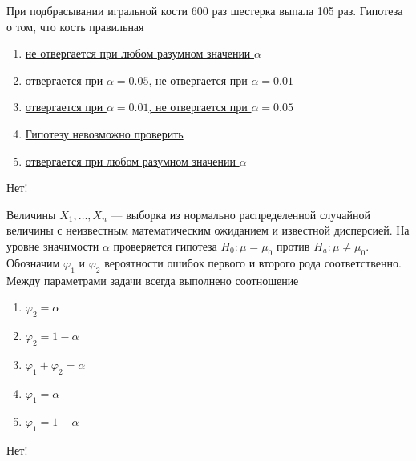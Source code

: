 \documentclass[t]{beamer}
\begin{document}
 \begin{frame} \label{13-No} 
\begin{block}{13} 

  При подбрасывании игральной кости 600 раз шестерка выпала 105 раз. Гипотеза о том, что кость правильная
  


 \end{block} 
\begin{enumerate} 
\item[] \hyperlink{13-Yes}{\beamergotobutton{} не отвергается при любом разумном значении $\alpha$}
\item[] \hyperlink{13-No}{\beamergotobutton{} отвергается при $\alpha = 0.05$, не отвергается при $\alpha = 0.01$}
\item[] \hyperlink{13-No}{\beamergotobutton{} отвергается при $\alpha = 0.01$, не отвергается при $\alpha = 0.05$}
\item[] \hyperlink{13-No}{\beamergotobutton{} Гипотезу невозможно проверить}
\item[] \hyperlink{13-No}{\beamergotobutton{} отвергается при любом разумном значении $\alpha$}
\end{enumerate} 

 \alert{Нет!} 
\end{frame} 


 \begin{frame} \label{14-No} 
\begin{block}{14} 

  Величины $X_1,\ldots,X_n$ — выборка из нормально распределенной случайной величины с неизвестным математическим ожиданием и известной дисперсией. На уровне значимости $\alpha$ проверяется гипотеза $H_0: \mu = \mu_0$ против $H_a: \mu \neq \mu_0$. Обозначим $\varphi_1$ и $\varphi_2$ вероятности ошибок первого и второго рода соответственно. Между параметрами задачи всегда выполнено соотношение
  


 \end{block} 
\begin{enumerate} 
\item[] \hyperlink{14-No}{\beamergotobutton{} $\varphi_2 = \alpha$}
\item[] \hyperlink{14-No}{\beamergotobutton{} $\varphi_2 = 1 - \alpha$}
\item[] \hyperlink{14-No}{\beamergotobutton{} $\varphi_1 + \varphi_2 = \alpha$}
\item[] \hyperlink{14-Yes}{\beamergotobutton{} $\varphi_1 = \alpha$}
\item[] \hyperlink{14-No}{\beamergotobutton{} $\varphi_1 = 1 - \alpha$}
\end{enumerate} 

 \alert{Нет!} 
\end{frame} 
\end{document}
